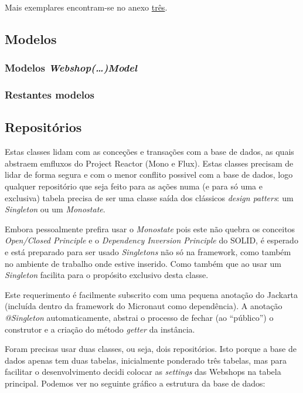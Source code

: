 Mais exemplares encontram-se no anexo \hyperref[an3]{três}.

\newpage

\subsection{Modelos}

\subsubsection*{Modelos \textit{Webshop(\ldots)Model}}

\subsubsection*{Restantes modelos}

\newpage

\subsection{Repositórios}

Estas classes lidam com as conceções e transações com a base de dados, as quais abstraem emfluxos do Project Reactor (Mono e Flux). Estas classes precisam de lidar de forma segura e com o menor conflito possivel com a base de dados, logo qualquer repositório que seja feito para as ações numa (e para só uma e exclusiva) tabela precisa de ser uma classe saída dos clássicos \textit{design patters}: um \textit{Singleton} ou um \textit{Monostate}.

Embora pessoalmente prefira usar o \textit{Monostate} pois este não quebra os conceitos \textit{Open/Closed Principle} e o \textit{Dependency Inversion Principle} do SOLID, é esperado e está preparado para ser usado \textit{Singletons} não só na framework, como também no ambiente de trabalho onde estive inserido. Como também que ao usar um \textit{Singleton} facilita para o propósito exclusivo desta classe.

Este requerimento é facilmente subscrito com uma pequena anotação do Jackarta (incluída dentro da framework do Micronaut como dependência). A anotação \textit{@Singleton} automaticamente, abstrai o processo de fechar (ao ``público'') o construtor e a criação do método \textit{getter} da instância.

Foram precisas usar duas classes, ou seja, dois repositórios. Isto porque a base de dados apenas tem duas tabelas, inicialmente ponderado três tabelas, mas para facilitar o desenvolvimento decidi colocar as \textit{settings} das Webshops na tabela principal. Podemos ver no seguinte gráfico a estrutura da base de dados:

